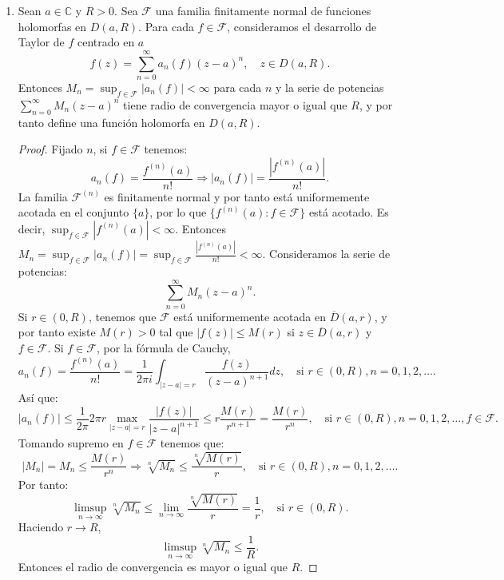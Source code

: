 \begin{example}
\begin{enumerate}
        \item Sean $a \in \mathbb{C}$ y $R > 0$.
              Sea $\mathcal{F}$ una familia finitamente normal de funciones holomorfas en $D(a, R)$.
              Para cada $f \in \mathcal{F}$, consideramos el desarrollo de Taylor de $f$ centrado en $a$
              $$f(z) = \sum_{n=0}^\infty a_n(f)(z-a)^n, \quad z \in D(a, R).$$
              Entonces $M_n = \sup_{f \in \mathcal{F}} |a_n(f)| < \infty$ para cada $n$ y la serie de potencias $\sum_{n=0}^\infty M_n(z-a)^n$ tiene radio de convergencia mayor o igual que $R$, y por tanto define una función holomorfa en $D(a, R)$.

              \begin{proof}
                  Fijado $n$, si $f \in \mathcal{F}$ tenemos:
                  $$a_n(f) = \frac{f^{(n)}(a)}{n!} \Rightarrow |a_n(f)| = \frac{|f^{(n)}(a)|}{n!}.$$
                  La familia $\mathcal{F}^{(n)}$ es finitamente normal y por tanto está uniformemente acotada en el conjunto $\{a\}$, por lo que $\{f^{(n)}(a) : f \in \mathcal{F}\}$ está acotado.
                  Es decir, $\sup_{f \in \mathcal{F}} |f^{(n)}(a)| < \infty$.
                  Entonces $M_n = \sup_{f \in \mathcal{F}} |a_n(f)| = \sup_{f \in \mathcal{F}} \frac{|f^{(n)}(a)|}{n!} < \infty$.
                  Consideramos la serie de potencias:
                  $$\sum_{n=0}^\infty M_n(z-a)^n.$$
                  Si $r \in (0, R)$, tenemos que $\mathcal{F}$ está uniformemente acotada en $\overline{D}(a, r)$, y por tanto existe $M(r) > 0$ tal que $|f(z)| \leq M(r)$ si $z \in \overline{D}(a, r)$ y $f \in \mathcal{F}$.
                  Si $f \in \mathcal{F}$, por la fórmula de Cauchy,
                  $$a_n(f) = \frac{f^{(n)}(a)}{n!} = \frac{1}{2\pi i} \int_{|z-a|=r} \frac{f(z)}{(z-a)^{n+1}}dz, \quad \text{si } r \in (0, R), n = 0, 1, 2, \dots.$$
                  Así que:
                  $$|a_n(f)| \leq \frac{1}{2\pi} 2\pi r \max_{|z-a|=r} \frac{|f(z)|}{|z-a|^{n+1}} \leq r\frac{M(r)}{r^{n+1}} = \frac{M(r)}{r^n}, \quad \text{si } r \in (0, R), n = 0, 1, 2, \dots, f \in \mathcal{F}.$$
                  Tomando supremo en $f \in \mathcal{F}$ tenemos que:
                  $$|M_n| = M_n \leq \frac{M(r)}{r^n} \Rightarrow \sqrt[n]{M_n} \leq \frac{\sqrt[n]{M(r)}}{r}, \quad \text{si } r \in (0, R), n = 0, 1, 2, \dots.$$
                  Por tanto:
                  $$\limsup_{n \to \infty} \sqrt[n]{M_n} \leq \lim_{n \to \infty} \frac{\sqrt[n]{M(r)}}{r} = \frac{1}{r}, \quad \text{si } r \in (0, R).$$
                  Haciendo $r \to R$,
                  $$\limsup_{n \to \infty} \sqrt[n]{M_n} \leq \frac{1}{R}.$$
                  Entonces el radio de convergencia es mayor o igual que $R$.
              \end{proof}


\end{enumerate}
\end{example}
